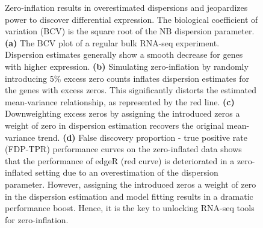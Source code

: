 \documentclass{bmcart}
\begin{document}
\begin{backmatter}
\begin{figure}[h!]
	\center
	\caption{Zero-inflation results in overestimated dispersions and jeopardizes power to discover differential expression. The biological coefficient of variation (BCV) is the square root of the NB dispersion parameter.
	\textbf{(a)} The BCV plot of a regular bulk RNA-seq experiment. Dispersion estimates generally show a smooth decrease for genes with higher expression.
	\textbf{(b)} Simulating zero-inflation by randomly introducing 5\% excess zero counts inflates dispersion estimates for the genes with excess zeros. This significantly distorts the estimated mean-variance relationship, as represented by the red line.
	\textbf{(c)} Downweighting excess zeros by assigning the introduced zeros a weight of zero in dispersion estimation recovers the original mean-variance trend.
	\textbf{(d)} False discovery proportion - true positive rate (FDP-TPR) performance curves on the zero-inflated data shows that the performance of edgeR (red curve) is deteriorated in a zero-inflated setting due to an overestimation of the dispersion parameter. However, assigning the introduced zeros a weight of zero in the dispersion estimation and model fitting results in a dramatic performance boost. Hence, it is the key to unlocking RNA-seq tools for zero-inflation.
	}
	\label{fig:introRNAseq}
\end{figure}




\end{backmatter}
\end{document}
